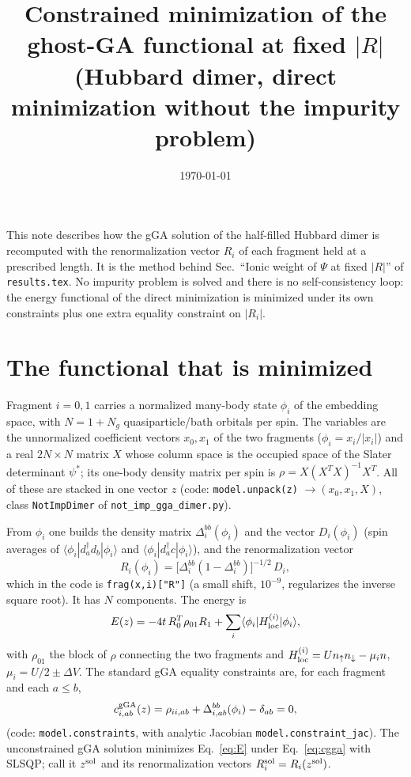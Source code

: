 \documentclass[11pt]{article}
\title{Constrained minimization of the ghost-GA functional at fixed $|R|$\\
\large (Hubbard dimer, direct minimization without the impurity problem)}
\author{}
\date{\today}
\newcommand{\Ng}{N_g}
\newcommand{\dV}{\Delta V}
\begin{document}
\maketitle

\noindent This note describes how the gGA solution of the half-filled Hubbard dimer is recomputed with the renormalization vector $R_i$ of each fragment held at a prescribed length. It is the method behind Sec.~``Ionic weight of $\Psi$ at fixed $|R|$'' of \texttt{results.tex}. No impurity problem is solved and there is no self-consistency loop: the energy functional of the direct minimization is minimized under its own constraints plus one extra equality constraint on $|R_i|$.

\section{The functional that is minimized}
Fragment $i=0,1$ carries a normalized many-body state $\phi_i$ of the embedding space, with $N=1+\Ng$ quasiparticle/bath orbitals per spin. The variables are the unnormalized coefficient vectors $x_0,x_1$ of the two fragments ($\phi_i=x_i/|x_i|$) and a real $2N\times N$ matrix $X$ whose column space is the occupied space of the Slater determinant $\psi^*$; its one-body density matrix per spin is $\rho=X(X^TX)^{-1}X^T$. All of these are stacked in one vector $z$ (code: \texttt{model.unpack(z)} $\to(x_0,x_1,X)$, class \texttt{NotImpDimer} of \texttt{not\_imp\_gga\_dimer.py}).

From $\phi_i$ one builds the density matrix $\Delta_i^{bb}(\phi_i)$ and the vector $D_i(\phi_i)$ (spin averages of $\langle\phi_i|d^\dagger_a d_b|\phi_i\rangle$ and $\langle\phi_i|d^\dagger_a c|\phi_i\rangle$), and the renormalization vector
\begin{equation}
R_i(\phi_i)=\big[\Delta_i^{bb}(1-\Delta_i^{bb})\big]^{-1/2}\,D_i ,
\label{eq:R}
\end{equation}
which in the code is \texttt{frag(x,i)["R"]} (a small shift, $10^{-9}$, regularizes the inverse square root). It has $N$ components. The energy is
\begin{equation}
E(z)=-4t\,R_0^{T}\rho_{01}R_1+\sum_{i}\langle\phi_i|H_{\rm loc}^{(i)}|\phi_i\rangle ,
\label{eq:E}
\end{equation}
with $\rho_{01}$ the block of $\rho$ connecting the two fragments and $H^{(i)}_{\rm loc}=Un_\uparrow n_\downarrow-\mu_i n$, $\mu_i=U/2\pm\dV$. The standard gGA equality constraints are, for each fragment and each $a\le b$,
\begin{equation}
c^{\rm gGA}_{i,ab}(z)=\rho_{ii,ab}+\Delta^{bb}_{i,ab}(\phi_i)-\delta_{ab}=0 ,
\label{eq:cgga}
\end{equation}
(code: \texttt{model.constraints}, with analytic Jacobian \texttt{model.constraint\_jac}). The unconstrained gGA solution minimizes Eq.~\eqref{eq:E} under Eq.~\eqref{eq:cgga} with SLSQP; call it $z^{\rm sol}$ and its renormalization vectors $R_i^{\rm sol}=R_i(z^{\rm sol})$.
\end{document}
